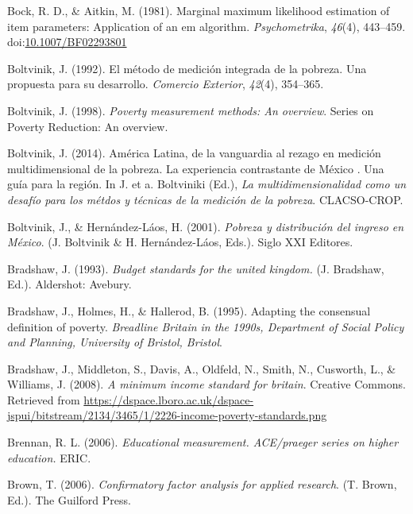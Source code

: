 \documentclass[]{book}
\begin{document}
\leavevmode\hypertarget{ref-Bock1981}{}%
Bock, R. D., \& Aitkin, M. (1981). Marginal maximum likelihood estimation of item parameters: Application of an em algorithm. \emph{Psychometrika}, \emph{46}(4), 443--459. doi:\href{https://doi.org/10.1007/BF02293801}{10.1007/BF02293801}

\leavevmode\hypertarget{ref-Boltvinik1992}{}%
Boltvinik, J. (1992). El método de medición integrada de la pobreza. Una propuesta para su desarrollo. \emph{Comercio Exterior}, \emph{42}(4), 354--365.

\leavevmode\hypertarget{ref-Boltvinik1998}{}%
Boltvinik, J. (1998). \emph{Poverty measurement methods: An overview}. Series on Poverty Reduction: An overview.

\leavevmode\hypertarget{ref-Boltvinik2014}{}%
Boltvinik, J. (2014). América Latina, de la vanguardia al rezago en medición multidimensional de la pobreza. La experiencia contrastante de México . Una guía para la región. In J. et a. Boltviniki (Ed.), \emph{La multidimensionalidad como un desafío para los métdos y técnicas de la medición de la pobreza}. CLACSO-CROP.

\leavevmode\hypertarget{ref-Boltvinik2001}{}%
Boltvinik, J., \& Hernández-Láos, H. (2001). \emph{Pobreza y distribución del ingreso en México}. (J. Boltvinik \& H. Hernández-Láos, Eds.). Siglo XXI Editores.

\leavevmode\hypertarget{ref-Bradshaw1993}{}%
Bradshaw, J. (1993). \emph{Budget standards for the united kingdom.} (J. Bradshaw, Ed.). Aldershot: Avebury.

\leavevmode\hypertarget{ref-Bradshaw1995}{}%
Bradshaw, J., Holmes, H., \& Hallerod, B. (1995). Adapting the consensual definition of poverty. \emph{Breadline Britain in the 1990s, Department of Social Policy and Planning, University of Bristol, Bristol}.

\leavevmode\hypertarget{ref-Bradshaw2008}{}%
Bradshaw, J., Middleton, S., Davis, A., Oldfeld, N., Smith, N., Cusworth, L., \& Williams, J. (2008). \emph{A minimum income standard for britain}. Creative Commons. Retrieved from \url{https://dspace.lboro.ac.uk/dspace-jspui/bitstream/2134/3465/1/2226-income-poverty-standards.png}

\leavevmode\hypertarget{ref-Brennan2006}{}%
Brennan, R. L. (2006). \emph{Educational measurement. ACE/praeger series on higher education.} ERIC.

\leavevmode\hypertarget{ref-Brown2006}{}%
Brown, T. (2006). \emph{Confirmatory factor analysis for applied research}. (T. Brown, Ed.). The Guilford Press.
\end{document}

